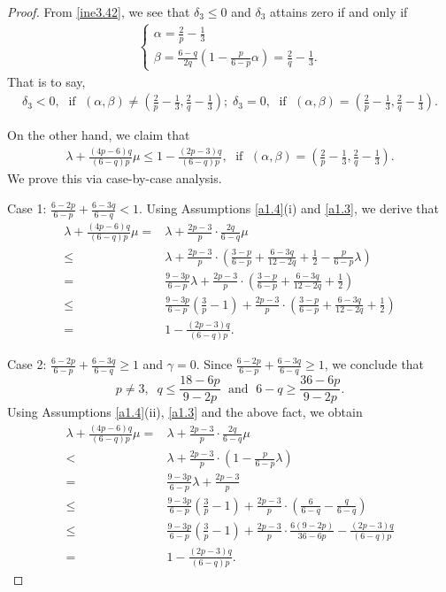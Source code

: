 \documentclass[11pt,reqno]{amsart}
\numberwithin{Thm}{section}
\begin{document}
\begin{proof}
From \eqref{ine3.42}, we see that $\delta_3\leq0$ and $\delta_3$ attains zero if and only if
\begin{align*}
\begin{cases}
\alpha=\frac{2}{p}-\frac{1}{3}\\
\beta=\frac{6-q}{2q}\left(1-\frac{p}{6-p}\alpha\right)=\frac{2}{q}-\frac{1}{3}.
\end{cases}
\end{align*}
That is to say,
\begin{align}\label{ine4.26}
\delta_3<0,\;\text{ if }\;(\alpha,\beta)\neq\left(\frac{2}{p}-\frac{1}{3},\frac{2}{q}-\frac{1}{3}\right);\;\delta_3=0,\;\text{ if }\;(\alpha,\beta)=\left(\frac{2}{p}-\frac{1}{3},\frac{2}{q}-\frac{1}{3}\right).
\end{align}



On the other hand, we claim that
\begin{align}\label{ine4.27}
\lambda+\frac{(4p-6)q}{(6-q)p}\mu\leq1-\frac{(2p-3)q}{(6-q)p},\;\text{ if }\;(\alpha,\beta)=\left(\frac{2}{p}-\frac{1}{3},\frac{2}{q}-\frac{1}{3}\right).
\end{align}
We prove this via case-by-case analysis.


\noindent Case 1: $\frac{6-2p}{6-p} + \frac{6-3q}{6-q} < 1$. Using Assumptions \ref{a1.4}(i) and \ref{a1.3}, we derive that
\begin{align*}
\lambda+\frac{(4p-6)q}{(6-q)p}\mu=&\lambda+\frac{2p-3}{p}\cdot\frac{2q}{6-q}\mu\\
\leq&\lambda+\frac{2p-3}{p}\cdot\left(\frac{3-p}{6-p}+\frac{6-3q}{12-2q}+\frac{1}{2}-\frac{p}{6-p}\lambda\right)\\
=&\frac{9-3p}{6-p}\lambda+\frac{2p-3}{p}\cdot\left(\frac{3-p}{6-p}+\frac{6-3q}{12-2q}+\frac{1}{2}\right)\\
\leq&\frac{9-3p}{6-p}\left(\frac{3}{p}-1\right)+\frac{2p-3}{p}\cdot\left(\frac{3-p}{6-p}+\frac{6-3q}{12-2q}+\frac{1}{2}\right)\\
=&1-\frac{(2p-3)q}{(6-q)p}.
\end{align*}

\noindent Case 2: $\frac{6-2p}{6-p} + \frac{6-3q}{6-q}\geq1$ and $\gamma=0$.  Since $\frac{6-2p}{6-p} + \frac{6-3q}{6-q}\geq1$, we conclude that
$$
p\neq3,\;\;q\leq\frac{18-6p}{9-2p} \;\text{ and }\;6-q\geq\frac{36-6p}{9-2p}.
$$
Using Assumptions \ref{a1.4}(ii), \ref{a1.3} and the above fact, we obtain
\begin{align*}
\lambda+\frac{(4p-6)q}{(6-q)p}\mu=&\lambda+\frac{2p-3}{p}\cdot\frac{2q}{6-q}\mu\\
<&\lambda+\frac{2p-3}{p}\cdot\left(1-\frac{p}{6-p}\lambda\right)\\
=&\frac{9-3p}{6-p}\lambda+\frac{2p-3}{p}\\
\leq&\frac{9-3p}{6-p}\left(\frac{3}{p}-1\right)+\frac{2p-3}{p}\cdot\left(\frac{6}{6-q}-\frac{q}{6-q}\right)\\
\leq&\frac{9-3p}{6-p}\left(\frac{3}{p}-1\right)+\frac{2p-3}{p}\cdot\frac{6(9-2p)}{36-6p}-\frac{(2p-3)q}{(6-q)p}\\
=&1-\frac{(2p-3)q}{(6-q)p}.
\end{align*}



\end{proof}
\end{document}
